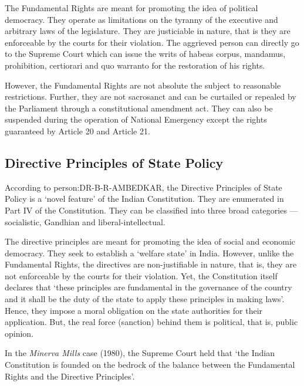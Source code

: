 The Fundamental Rights are meant for promoting the idea of political democracy. They operate as limitations on the tyranny of the executive and arbitrary laws of the legislature. They are justiciable in nature, that is they are enforceable by the courts for their violation. The aggrieved person can directly go to the Supreme Court which can issue the writs of { habeas corpus}, { mandamus}, prohibition, { certiorari} and { quo warranto} for the restoration of his rights.

However, the Fundamental Rights are not absolute the subject to reasonable restrictions. Further, they are not sacrosanct and can be curtailed or repealed by the Parliament through a constitutional amendment act. They can also be suspended during the operation of National Emergency except the rights guaranteed by Article 20 and Article 21.

\subsection{Directive Principles of State Policy}

According to \gls{person:DR-B-R-AMBEDKAR}, the Directive Principles of State Policy is a `novel feature' of the Indian Constitution. They are enumerated in Part IV of the Constitution. They can be classified into three broad categories — socialistic, Gandhian and liberal-intellectual.

The directive principles are meant for promoting the idea of social and economic democracy. They seek to establish a `welfare state' in India. However, unlike the Fundamental Rights, the directives are non-justifiable in nature, that is, they are not enforceable by the courts for their violation. Yet, the Constitution itself declares that `these principles are fundamental in the governance of the country and it shall be the duty of the state to apply these principles in making laws'. Hence, they impose a moral obligation on the state authorities for their application. But, the real force (sanction) behind them is political, that is, public opinion.

In the { \textit{Minerva Mills}} case (1980), the Supreme Court held that `the Indian Constitution is founded on the bedrock of the balance between the Fundamental Rights and the Directive Principles'.

